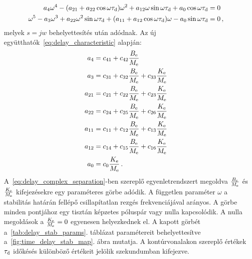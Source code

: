 \begin{align}\label{eq:delay_complex_separation}
    \begin{split}
        a_4\omega^4-(a_{21} + a_{22}\cos{\omega\tau_{\mathrm{d}}})\omega^2+a_{12}\omega\sin{\omega\tau_{\mathrm{d}}} + a_0\cos{\omega\tau_{\mathrm{d}}} &= 0 \\
        \omega^5 -a_3\omega^3 + a_{22}\omega^2\sin{\omega\tau_{\mathrm{d}}} + (a_{11} + a_{12}\cos{\omega\tau_{\mathrm{d}}})\omega - a_0\sin{\omega\tau_{\mathrm{d}}}  &= 0 \,,
    \end{split}
\end{align}
melyek \(s=jw\) behelyettesítés után adódnak. Az új együtthatók~\eqref{eq:delay_characteristic} alapján:
\begin{align}
    \begin{split}
        a_4 &= c_{41} + c_{42}\frac{B_{\mathrm{e}}}{M_{\mathrm{e}}}\\ 
        a_3 &= c_{31} + c_{32}\frac{B_{\mathrm{e}}}{M_{\mathrm{e}}} + c_{33}\frac{K_{\mathrm{e}}}{M_{\mathrm{e}}}\\ 
        a_{21} &= c_{21} + c_{22}\frac{B_{\mathrm{e}}}{M_{\mathrm{e}}} + c_{23}\frac{K_{\mathrm{e}}}{M_{\mathrm{e}}}\\ 
        a_{22} &= c_{24} + c_{25}\frac{B_{\mathrm{e}}}{M_{\mathrm{e}}} + c_{26}\frac{K_{\mathrm{e}}}{M_{\mathrm{e}}}\\ 
        a_{11} &= c_{11} + c_{12}\frac{B_{\mathrm{e}}}{M_{\mathrm{e}}} + c_{13}\frac{K_{\mathrm{e}}}{M_{\mathrm{e}}}\\ 
        a_{12} &= c_{14} + c_{15}\frac{B_{\mathrm{e}}}{M_{\mathrm{e}}} + c_{16}\frac{K_{\mathrm{e}}}{M_{\mathrm{e}}}\\ 
        a_0 &= c_0 \frac{K_{\mathrm{e}}}{M_{\mathrm{e}}}\,.
    \end{split}
\end{align}
A~\eqref{eq:delay_complex_separation}-ben szereplő egyenletrendszert megoldva \(\frac{B_{\mathrm{e}}}{M_{\mathrm{e}}}\)
és \(\frac{K_{\mathrm{e}}}{M_{\mathrm{e}}}\) kifejezésekre egy paraméteres görbe adódik. 
A független paraméter \(\omega\) a stabilitás határán fellépő csillapítatlan rezgés frekvenciájával
arányos. A görbe minden pontjához egy tisztán képzetes póluspár vagy nulla kapcsolódik. 
A nulla megoldások a \(\frac{K_{\mathrm{e}}}{M_{\mathrm{e}}} = 0\) egyenesen helyezkednek el. 
A kapott görbét a~\ref{tab:delay_stab_params}. táblázat paramétereit behelyettesítve 
a~\ref{fig:time_delay_stab_map}. ábra mutatja. A kontúrvonalakon szereplő értékek \(\tau_{\mathrm{d}}\)
időkésés különböző értékeit jelölik szekundumban kifejezve.

